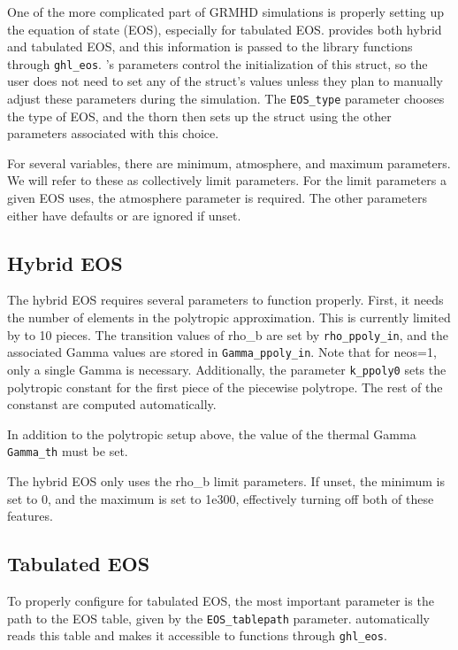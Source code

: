 \documentclass{article}
\begin{document}
One of the more complicated part of GRMHD simulations is properly
setting up the equation of state (EOS), especially for tabulated EOS.
\grhayl{} provides both hybrid and tabulated EOS, and this information
is passed to the library functions through \texttt{ghl\_eos}. \glib's
parameters control the initialization of this struct, so the user does
not need to set any of the struct's values unless they plan to manually
adjust these parameters during the simulation. The \texttt{EOS\_type}
parameter chooses the type of EOS, and the thorn then sets up the struct
using the other parameters associated with this choice.

For several variables, there are minimum, atmosphere, and maximum parameters.
We will refer to these as collectively limit parameters. For the limit
parameters a given EOS uses, the atmosphere parameter is required. The other
parameters either have defaults or are ignored if unset.

\subsection{Hybrid EOS}

The hybrid EOS requires several parameters to function properly.
First, it needs the number of elements in the polytropic approximation.
This is currently limited by \grhayl{} to 10 pieces. The transition values
of rho\_b are set by \texttt{rho\_ppoly\_in}, and the associated Gamma
values are stored in \texttt{Gamma\_ppoly\_in}. Note that for neos=1,
only a single Gamma is necessary. Additionally, the parameter \texttt{k\_ppoly0}
sets the polytropic constant for the first piece of the piecewise polytrope.
The rest of the constanst are computed automatically.

In addition to the polytropic setup above, the value of the thermal Gamma
\texttt{Gamma\_th} must be set.

The hybrid EOS only uses the rho\_b limit parameters. If unset, the
minimum is set to 0, and the maximum is set to 1e300, effectively turning
off both of these features.

\subsection{Tabulated EOS}

To properly configure for tabulated EOS, the most important parameter is
the path to the EOS table, given by the \texttt{EOS\_tablepath} parameter.
\glib{} automatically reads this table and makes it accessible to \grhayl{}
functions through \texttt{ghl\_eos}.
\end{document}
